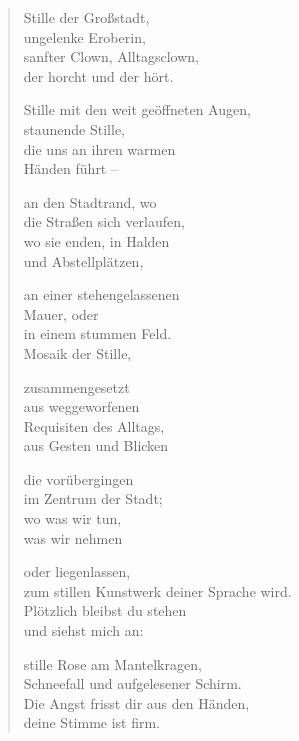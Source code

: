 
\cleartoverso



\begin{verse}

Stille der Großstadt,\\
ungelenke Eroberin,\\
sanfter Clown, Alltagsclown,\\
der horcht und der hört.

Stille mit den weit geöffneten Augen,\\
staunende Stille,\\
die uns an ihren warmen\\
Händen führt --

an den Stadtrand, wo\\
die Straßen sich verlaufen,\\
wo sie enden, in Halden\\
und Abstellplätzen,

an einer stehengelassenen\\
Mauer, oder\\
in einem stummen Feld.\\
Mosaik der Stille,

zusammengesetzt\\
aus weggeworfenen\\
Requisiten des Alltags,\\
aus Gesten und Blicken

\clearpage

die vorübergingen\\
im Zentrum der Stadt;\\
wo was wir tun,\\
was wir nehmen

oder liegenlassen,\\
zum stillen Kunstwerk deiner Sprache wird.\\
Plötzlich bleibst du stehen\\
und siehst mich an:

stille Rose am Mantelkragen,\\
Schneefall und aufgelesener Schirm.\\
Die Angst frisst dir aus den Händen,\\
deine Stimme ist firm.

\end{verse}

\clearpage


